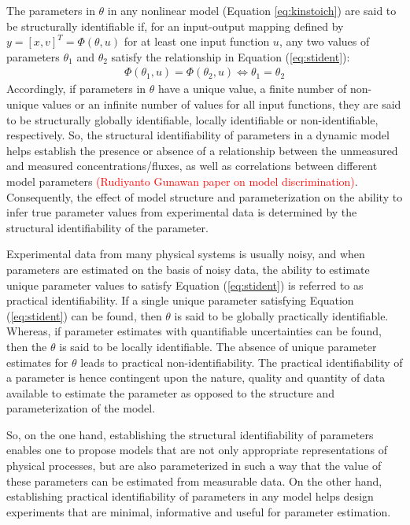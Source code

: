 \documentclass[10pt]{article}
\begin{document}
	The parameters in $\theta$ in any nonlinear model (Equation \ref{eq:kinstoich}) are said to be structurally identifiable if, for an input-output mapping defined by $y = \left[x, v\right]^T = \Phi(\theta,u)$ for at least one input function $u$, any two values of parameters $\theta_1$ and $\theta_2$ satisfy the relationship in Equation (\ref{eq:stident}):
	\begin{align}\label{eq:stident}
	\Phi(\theta_1,u) = \Phi(\theta_2,u) \iff \theta_1 = \theta_2
	\end{align}
	Accordingly, if parameters in $\theta$ have a unique value, a finite number of non-unique values or an infinite number of values for all input functions, they are said to be structurally globally identifiable, locally identifiable or non-identifiable, respectively. So, the structural identifiability of parameters in a dynamic model helps establish the presence or absence of a relationship between the unmeasured and measured concentrations/fluxes, as well as correlations between different model parameters \textcolor{red}{(Rudiyanto Gunawan paper on model discrimination)}. Consequently, the effect of model structure and parameterization on the ability to infer true parameter values from experimental data is determined by the structural identifiability of the parameter. 
		
	Experimental data from many physical systems is usually noisy, and when parameters are estimated on the basis of noisy data, the ability to estimate unique parameter values to satisfy Equation (\ref{eq:stident}) is referred to as practical identifiability. If a single unique parameter satisfying Equation (\ref{eq:stident}) can be found, then $\theta$ is said to be globally practically identifiable. Whereas, if parameter estimates with quantifiable uncertainties can be found, then the $\theta$ is said to be locally identifiable. The absence of unique parameter estimates for $\theta$ leads to practical non-identifiability. The practical identifiability of a parameter is hence contingent upon the nature, quality and quantity of data available to estimate the parameter as opposed to the structure and parameterization of the model. 
		
	So, on the one hand, establishing the structural identifiability of parameters enables one to propose models that are not only appropriate representations of physical processes, but are also parameterized in such a way that the value of these parameters can be estimated from measurable data. On the other hand, establishing practical identifiability of parameters in any model helps design experiments that are minimal, informative and useful for parameter estimation.		
\end{document}
